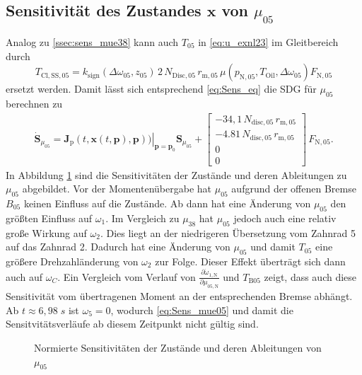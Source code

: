\subsection{Sensitivität des Zustandes $\pmb{x}$ von $\mu_{05}$}
Analog zu \ref{ssec:sens_mue38} kann auch $T_{05}$ in \eqref{eq:u_exnl23} im Gleitbereich durch
\begin{equation}
T_\mathrm{Cl,SS,05} = k_\mathrm{sign}(\Delta \omega_{05},z_{05})\,2\,N_{\mathrm{Disc,05}}\,r_{\mathrm{m},05}\,\mu(p_\mathrm{N,05},T_\mathrm{Oil},\Delta \omega_{05})F_\mathrm{N,05}
\end{equation}
ersetzt werden. Damit lässt sich entsprechend \eqref{eq:Sens_eq} die SDG für $\mu_{05}$ berechnen zu
\begin{align}\label{eq:Sens_mue05}
\dot{\pmb{S}}_{\mu_{05}} = \left. \pmb{J}_\mathrm{p}(t,\pmb{x}(t,\pmb{p}),\pmb{p}))\right|_{\pmb{p}=\pmb{p}_0} \pmb{S}_{\mu_{05}}
+ \begin{bmatrix} -34,1\,N_\mathrm{disc,05}\,r_{\mathrm{m},05} \\ -4.81\,N_\mathrm{disc,05}\,r_{\mathrm{m},05} \\ 0 \\ 0 \end{bmatrix}\,F_\mathrm{N,05}.
\end{align}
In Abbildung \ref{fig:Sens_mu05} sind die Sensitivitäten der Zustände und deren Ableitungen zu $\mu_{05}$ abgebildet. Vor der Momentenübergabe hat $\mu_{05}$ aufgrund der offenen Bremse $B_{05}$ keinen Einfluss auf die Zustände. Ab dann hat eine Änderung von $\mu_{05}$ den größten Einfluss auf $\omega_1$. Im Vergleich zu $\mu_{38}$ hat $\mu_{05}$ jedoch auch eine relativ große Wirkung auf $\omega_2$. Dies liegt an der niedrigeren Übersetzung vom Zahnrad 5 auf das Zahnrad 2. Dadurch hat eine Änderung von $\mu_{05}$ und damit $T_{05}$ eine größere Drehzahländerung von $\omega_2$ zur Folge. Dieser Effekt überträgt sich dann auch auf $\omega_C$. Ein Vergleich vom Verlauf von $\frac{\partial \dot{\omega}_\mathrm{1,N}}{\partial \mu_\mathrm{05,N}}$ und $T_\mathrm{B05}$ zeigt, dass auch diese Sensitivität vom übertragenen Moment an der entsprechenden Bremse abhängt. Ab $t\approx 6,98\;s$ ist $\omega_5 = 0$, wodurch \eqref{eq:Sens_mue05} und damit die Sensitvitätsverläufe ab diesem Zeitpunkt nicht gültig sind. 


\begin{figure}
\centering
\newlength\muuheight 
\setlength\muuheight{8cm}
\newlength\muuwidth 
\setlength\muuwidth{13cm}

\caption{Normierte Sensitivitäten der Zustände und deren Ableitungen von $\mu_{05}$}
\label{fig:Sens_mu05}
\end{figure}

